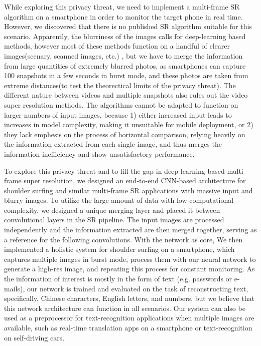 While exploring this privacy threat, we need to implement a multi-frame SR algorithm on a smartphone in order to monitor the target phone in real time. However, we discovered that there is no published SR algorithm suitable for this scenario. Apparently, the blurriness of the images calls for deep-learning based methods, however most of these methods function on a handful of clearer images(scenary, scanned images, etc.) \cite{nasrollahi2020deep} \cite{lyn2020image}, but we have to merge the information from large quantities of extremely blurred photos, as smartphones can capture 100 snapshots in a few seconds in burst mode, and these photos are taken from extreme distances(to test the theorectical limits of the privacy threat). The different nature between videos and multiple snapshots also rules out the video super resolution methods. The algorithms cannot be adapted to function on larger numbers of input images, because 1) either increased input leads to increases in model complexity, making it unsuitable for mobile deployment, or 2) they lack emphesis on the process of horizontal comparison, relying heavily on the information extracted from each single image, and thus merges the information inefficiency and show unsatisfactory performance. 

To explore this privacy threat and to fill the gap in deep-learning based multi-frame super resolution, we designed an end-to-end CNN-based architecture for shoulder surfing and similar multi-frame SR applications with massive input and blurry images. To utilize the large amount of data with low computational complexity, we designed a unique merging layer and placed it between convolutional layers in the SR pipeline. The input images are processed independently and the information extracted are then merged together, serving as a reference for the following convolutions. With the network as core, We then implemented a holistic system for shoulder surfing on a smartphone, which captures multiple images in burst mode, process them with our neural network to generate a high-res image, and repeating this process for constant monitoring. As the information of interest is mostly in the form of text (e.g. passwords or e-mails), our network is trained and evaluated on the task of reconstructing text, specifically, Chinese characters, English letters, and numbers, but we believe that this network architecture can function in all scenarios. Our system can also be used as a preprocessor for text-recognition applications when multiple images are available, such as real-time translation apps on a smartphone or text-recognition on self-driving cars.

